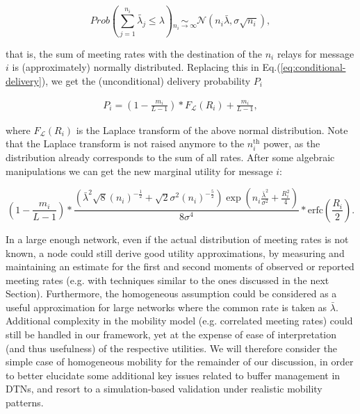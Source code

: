 \begin{equation}
Prob(\sum_{j=1}^{n_{i}} \tilde{\lambda_{j}} \le \lambda) \underset{n_{i} \rightarrow \infty}{\sim} \mathcal{N}(n_{i}\bar{\lambda}, \sigma \sqrt{n_{i}}),
\end{equation}

that is, the sum of meeting rates with the destination of the $n_{i}$ relays for message $i$ is (approximately) normally distributed. Replacing this in Eq.(\ref{eq:conditional-delivery}), we get the (unconditional) delivery probability $P_{i}$

\begin{eqnarray*}
P_{i} = (1 - \frac{m_i}{L-1})* F_{\mathcal{L}}(R_{i}) + \frac{m_i}{L-1},
\end{eqnarray*}

where $F_{\mathcal{L}}(R_{i})$ is the Laplace transform of the above normal distribution. Note that the Laplace transform is not raised anymore to the $n_{i}^{\mbox{th}}$ power, as the distribution already corresponds to the sum of all rates. After some algebraic manipulations we can get the new marginal utility for message $i$:

\footnotesize
\begin{equation}
(1 - \frac{m_i}{L-1}) * \frac{ (\bar{\lambda}^{2} \sqrt{8} (n_{i})^{-\frac{1}{2}} + \sqrt{2} \sigma^{2} (n_{i})^{-\frac{5}{2}}) \exp( n_{i} \frac{\bar{\lambda}^{2}}{\sigma^{2}} + \frac{R_{i}^{2}}{4} )}{8 \sigma^{4}} * \mbox{erfc}(\frac{R_{i}}{2}).
\end{equation}
\normalsize

In a large enough network, even if the actual distribution of meeting rates is not known, a node could still derive good utility approximations, by measuring and maintaining an estimate for the first and second moments of observed or reported meeting rates (e.g. with techniques similar to the ones discussed in the next Section). Furthermore, the homogeneous assumption could be considered as a useful approximation for large networks where the common rate is taken as $\bar{\lambda}$. Additional complexity in the mobility model (e.g. correlated meeting rates) could still be handled in our framework, yet at the expense of ease of interpretation (and thus usefulness) of the respective utilities. We will therefore consider the simple case of homogeneous mobility for the remainder of our discussion, in order to better elucidate some additional key issues related to buffer management in DTNs, and resort to a simulation-based validation under realistic mobility patterns.

